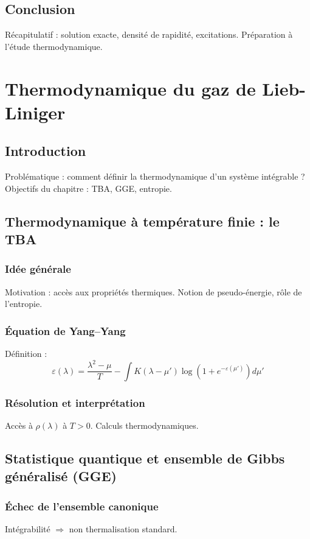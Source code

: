 \section*{Conclusion}
Récapitulatif : solution exacte, densité de rapidité, excitations. Préparation à l’étude thermodynamique.


\chapter{Thermodynamique du gaz de Lieb-Liniger}

\section*{Introduction}
Problématique : comment définir la thermodynamique d’un système intégrable ? Objectifs du chapitre : TBA, GGE, entropie.

\section{Thermodynamique à température finie : le TBA}

\subsection{Idée générale}
Motivation : accès aux propriétés thermiques. Notion de pseudo-énergie, rôle de l’entropie.

\subsection{Équation de Yang–Yang}
Définition :
\[
\varepsilon(\lambda) = \frac{\lambda^2 - \mu}{T} - \int K(\lambda - \mu') \log\left(1 + e^{-\varepsilon(\mu')} \right) d\mu'
\]

\subsection{Résolution et interprétation}
Accès à $\rho(\lambda)$ à $T>0$. Calculs thermodynamiques.

\section{Statistique quantique et ensemble de Gibbs généralisé (GGE)}

\subsection{Échec de l'ensemble canonique}
Intégrabilité $\Rightarrow$ non thermalisation standard.

